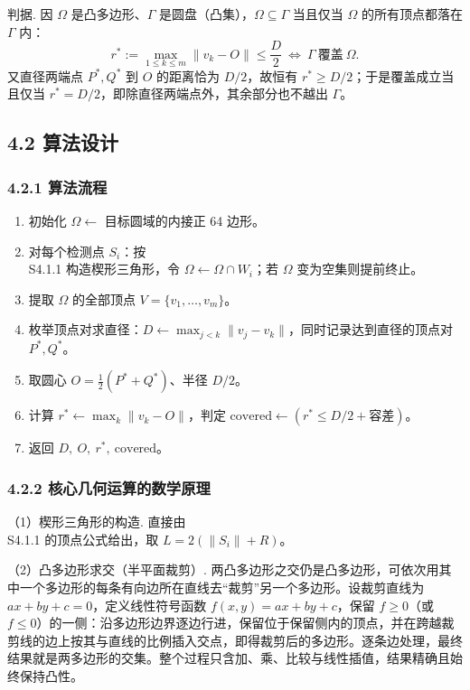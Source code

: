 \documentclass[UTF8, zihao=5,AutoFakeBold=2]{ctexart}
\begin{document}
	判据. 因 \(\Omega\) 是凸多边形、\(\Gamma\) 是圆盘（凸集），\(\Omega\subseteq\Gamma\) 当且仅当 \(\Omega\) 的所有顶点都落在 \(\Gamma\) 内：
	\[
		r^*:=\max_{1\le k\le m}\lVert v_k-O\rVert\le\frac{D}{2}
		\ \Longleftrightarrow\ \Gamma\ \text{覆盖}\ \Omega .
	\]
	又直径两端点 \(P^*,Q^*\) 到 \(O\) 的距离恰为 \(D/2\)，故恒有 \(r^*\ge D/2\)；于是覆盖成立当且仅当 \(r^*=D/2\)，即除直径两端点外，其余部分也不越出 \(\Gamma\)。

	\subsection*{4.2 \quad 算法设计}

	\subsubsection*{4.2.1 \quad 算法流程}

	\begin{enumerate}
		\item 初始化 \(\Omega\leftarrow\) 目标圆域的内接正 64 边形。
		\item 对每个检测点 \(S_i\)：按 \\S4.1.1 构造楔形三角形，令 \(\Omega\leftarrow\Omega\cap W_i\)；若 \(\Omega\) 变为空集则提前终止。
		\item 提取 \(\Omega\) 的全部顶点 \(V=\{v_1,\dots,v_m\}\)。
		\item 枚举顶点对求直径：\(D\leftarrow\max_{j<k}\lVert v_j-v_k\rVert\)，同时记录达到直径的顶点对 \(P^*,Q^*\)。
		\item 取圆心 \(O=\tfrac12(P^*+Q^*)\)、半径 \(D/2\)。
		\item 计算 \(r^*\leftarrow\max_k\lVert v_k-O\rVert\)，判定 \(\mathrm{covered}\leftarrow(r^*\le D/2+\text{容差})\)。
		\item 返回 \(D,\ O,\ r^*,\ \mathrm{covered}\)。
	\end{enumerate}

	\subsubsection*{4.2.2 \quad 核心几何运算的数学原理}

	（1）楔形三角形的构造. 直接由 \\S4.1.1 的顶点公式给出，取 \(L=2(\lVert S_i\rVert+R)\)。

	（2）凸多边形求交（半平面裁剪）. 两凸多边形之交仍是凸多边形，可依次用其中一个多边形的每条有向边所在直线去“裁剪”另一个多边形。设裁剪直线为 \(ax+by+c=0\)，定义线性符号函数 \(f(x,y)=ax+by+c\)，保留 \(f\ge0\)（或 \(f\le0\)）的一侧：沿多边形边界逐边行进，保留位于保留侧内的顶点，并在跨越裁剪线的边上按其与直线的比例插入交点，即得裁剪后的多边形。逐条边处理，最终结果就是两多边形的交集。整个过程只含加、乘、比较与线性插值，结果精确且始终保持凸性。
\end{document}
